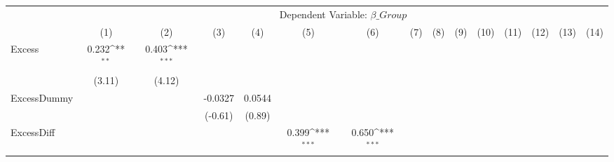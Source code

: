 {
\def\sym#1{\ifmmode^{#1}\else\(^{#1}\)\fi}
\begin{tabular}{l*{14}{c}}
\hline\hline
                &\multicolumn{14}{c}{Dependent Variable: $ \beta\_{Group} $ }                                                                                                                                                                                                              \\\cmidrule(lr){2-15}
                &\multicolumn{1}{c}{(1)}         &\multicolumn{1}{c}{(2)}         &\multicolumn{1}{c}{(3)}         &\multicolumn{1}{c}{(4)}         &\multicolumn{1}{c}{(5)}         &\multicolumn{1}{c}{(6)}         &\multicolumn{1}{c}{(7)}         &\multicolumn{1}{c}{(8)}         &\multicolumn{1}{c}{(9)}         &\multicolumn{1}{c}{(10)}         &\multicolumn{1}{c}{(11)}         &\multicolumn{1}{c}{(12)}         &\multicolumn{1}{c}{(13)}         &\multicolumn{1}{c}{(14)}         \\
\hline
Excess          &    0.232\sym{**} &    0.403\sym{***}&                  &                  &                  &                  &                  &                  &                  &                  &                  &                  &                  &                  \\
                &   (3.11)         &   (4.12)         &                  &                  &                  &                  &                  &                  &                  &                  &                  &                  &                  &                  \\
[1em]
ExcessDummy     &                  &                  &  -0.0327         &   0.0544         &                  &                  &                  &                  &                  &                  &                  &                  &                  &                  \\
                &                  &                  &  (-0.61)         &   (0.89)         &                  &                  &                  &                  &                  &                  &                  &                  &                  &                  \\
[1em]
ExcessDiff      &                  &                  &                  &                  &    0.399\sym{***}&    0.650\sym{***}&                  &                  &                  &                  &                  &                  &                  &                  \\

\end{tabular}}
